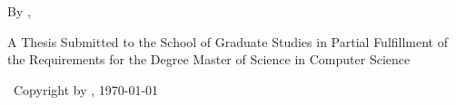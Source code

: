 \null %
\vspace{0.2\textheight}

\begin{center}
  \MakeUppercase{\thesisTitle}

  \vspace{2cm}

  By \MakeUppercase{\thesisAuthorName}, \thesisAuthorCredentials{}

  \vfill

  A Thesis Submitted to the School of Graduate Studies in Partial Fulfillment of
  the Requirements for the Degree Master of Science in Computer Science

  \vspace{2cm}

  \thesisInstitution \textcopyright\ Copyright by \thesisAuthorName{}, \today

\end{center}
